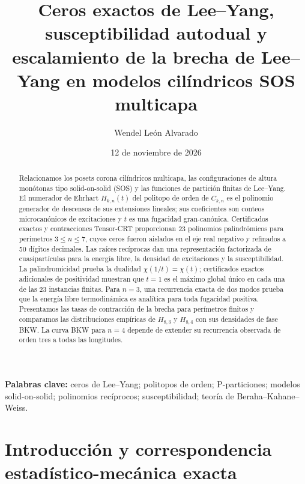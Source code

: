 \documentclass[11pt]{article}
\title{Ceros exactos de Lee--Yang, susceptibilidad autodual y escalamiento de la brecha de Lee--Yang en modelos cilíndricos SOS multicapa}
\author{Wendel León Alvarado}
\date{12 de noviembre de 2026}
\begin{document}
\maketitle

\begin{abstract}
Relacionamos los posets corona cilíndricos multicapa, las configuraciones de altura monótonas tipo solid-on-solid (SOS) y las funciones de partición finitas de Lee--Yang. El numerador de Ehrhart $H_{k,n}(t)$ del politopo de orden de $C_{k,n}$ es el polinomio generador de descensos de sus extensiones lineales; sus coeficientes son conteos microcanónicos de excitaciones y $t$ es una fugacidad gran-canónica. Certificados exactos y contracciones Tensor-CRT proporcionan 23 polinomios palindrómicos para perímetros $3\le n\le7$, cuyos ceros fueron aislados en el eje real negativo y refinados a 50 dígitos decimales. Las raíces recíprocas dan una representación factorizada de cuasipartículas para la energía libre, la densidad de excitaciones y la susceptibilidad. La palindromicidad prueba la dualidad $\chi(1/t)=\chi(t)$; certificados exactos adicionales de positividad muestran que $t=1$ es el máximo global único en cada una de las 23 instancias finitas. Para $n=3$, una recurrencia exacta de dos modos prueba que la energía libre termodinámica es analítica para toda fugacidad positiva. Presentamos las tasas de contracción de la brecha para perímetros finitos y comparamos las distribuciones empíricas de $H_{8,3}$ y $H_{8,4}$ con sus densidades de fase BKW. La curva BKW para $n=4$ depende de extender su recurrencia observada de orden tres a todas las longitudes.
\end{abstract}

\noindent\textbf{Palabras clave:} ceros de Lee--Yang; politopos de orden; P-particiones; modelos solid-on-solid; polinomios recíprocos; susceptibilidad; teoría de Beraha--Kahane--Weiss.

\section{Introducción y correspondencia estadístico-mecánica exacta}
\end{document}
